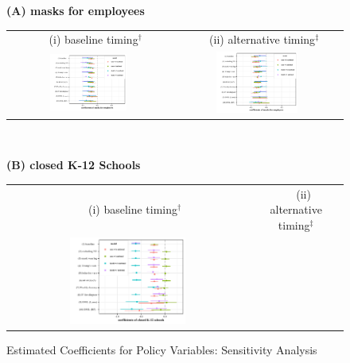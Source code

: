 \documentclass[11pt,reqno,letter]{amsart}
\theoremstyle{definition}
\begin{document}
\begin{figure}[ht]
  \caption{Estimated Coefficients for  Policy Variables: Sensitivity Analysis \label{fig:whisker}}\bigskip
  \begin{minipage}{\linewidth}
    \centering
   {\textbf{(A)  masks for employees}}\\
    \medskip
    \begin{tabular}{cc}  
 $\quad$  (i) baseline timing$^\dagger$ &$\quad$ (ii) alternative timing$^\ddagger$\\ 
      \includegraphics[width=0.5\textwidth]{tables_and_figures/pmaskbus-whisker-14}
      &
      \includegraphics[width=0.5\textwidth]{tables_and_figures/pmaskbus-whisker-7} 
    \end{tabular}
  \end{minipage} \\\smallskip
    \begin{minipage}{\linewidth}
    \centering 
     {\textbf{(B)  closed K-12 Schools}}\\
    \medskip
    \begin{tabular}{cc}  
 $\quad$  (i) baseline timing$^\dagger$ &$\quad$ (ii) alternative timing$^\ddagger$\\ 
      \includegraphics[width=0.5\textwidth]{tables_and_figures/pk12-whisker-14}

\end{tabular}
\end{minipage}
\end{figure}
\end{document}
